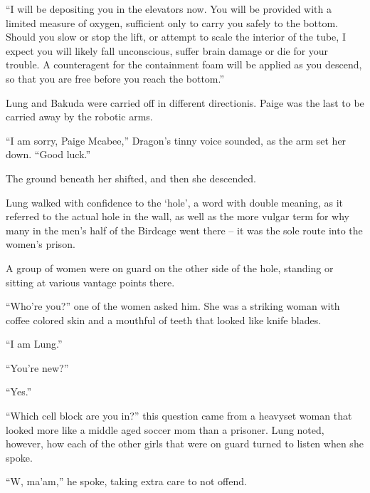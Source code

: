 ``I will be depositing you in the elevators now.  You will be provided with a limited measure of oxygen, sufficient only to carry you safely to the bottom.  Should you slow or stop the lift, or attempt to scale the interior of the tube, I expect you will likely fall unconscious, suffer brain damage or die for your trouble.  A counteragent for the containment foam will be applied as you descend, so that you are free before you reach the bottom.''



Lung and Bakuda were carried off in different directionis.  Paige was the last to be carried away by the robotic arms.



``I am sorry, Paige Mcabee,'' Dragon's tinny voice sounded, as the arm set her down.  ``Good luck.''



The ground beneath her shifted, and then she descended.



\sectionbreak



Lung walked with confidence to the `hole', a word with double meaning, as it referred to the actual hole in the wall, as well as the more vulgar term for why many in the men's half of the Birdcage went there – it was the sole route into the women's prison.



A group of women were on guard on the other side of the hole, standing or sitting at various vantage points there.



``Who're you?'' one of the women asked him.  She was a striking woman with coffee colored skin and a mouthful of teeth that looked like knife blades.



``I am Lung.''



``You're new?''



``Yes.''



``Which cell block are you in?'' this question came from a heavyset woman that looked more like a middle aged soccer mom than a prisoner.  Lung noted, however, how each of the other girls that were on guard turned to listen when she spoke.



``W, ma'am,'' he spoke, taking extra care to not offend.



